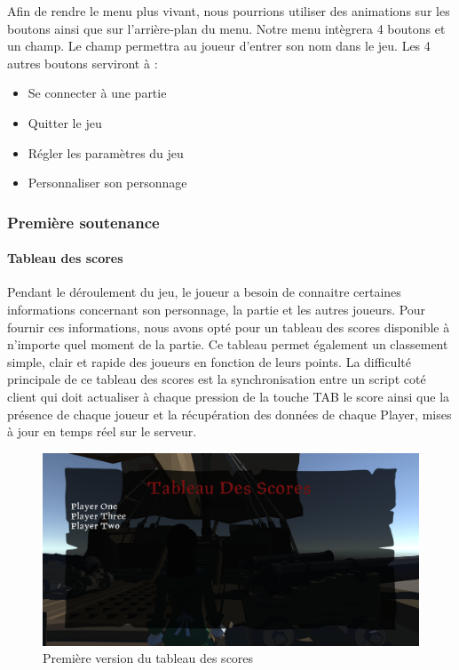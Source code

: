         Afin de rendre le menu plus vivant, 
        nous pourrions utiliser des animations sur les boutons ainsi que sur l’arrière-plan du menu. 
        Notre menu intègrera 4 boutons et un champ. Le champ permettra au joueur d’entrer son nom dans le jeu.
        Les 4 autres boutons serviront à :
        \begin{itemize}
                \item Se connecter à une partie
                \item Quitter le jeu
                \item Régler les paramètres du jeu
                \item Personnaliser son personnage
        \end{itemize}


    \subsubsection{Première soutenance}
        
        \paragraph{Tableau des scores}

            Pendant le déroulement du jeu, le joueur a besoin de connaitre certaines informations concernant son personnage, la partie et les autres joueurs. 
            Pour fournir ces informations, nous avons opté pour un tableau des scores disponible à n’importe quel moment de la partie. Ce tableau permet également un classement simple, clair et rapide des joueurs en fonction de leurs points.
            La difficulté principale de ce tableau des scores est la synchronisation entre un script coté client qui doit actualiser à chaque pression de la touche TAB le score ainsi que la présence de chaque joueur et la récupération des données de chaque Player, mises à jour en temps réel sur le serveur.
            
            \begin{figure}[hbt!]
                    \centering
                    \includegraphics[scale=0.29]{img/scoreboard.PNG}
                    \caption{Première version du tableau des scores}
            \end{figure}
            \FloatBarrier


